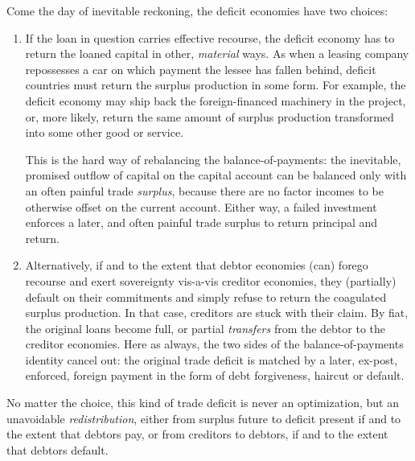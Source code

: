 \documentclass[11pt,a4paper,oneside,openright]{article}
\begin{document}
\begin{description}
\begin{enumerate}
		Come the day of inevitable reckoning, the deficit economies have two choices:
		\begin{enumerate}
			\item If the loan in question carries effective recourse, the deficit economy has to return the loaned capital in other, \emph{material} ways. 
			As when a leasing company repossesses a car on which payment the lessee has fallen behind, deficit countries must return the surplus production in some form. 
			For example, the deficit economy may ship back the foreign-financed machinery in the project, or, more likely, return the same amount of surplus production transformed into some other good or service. 
			
			This is the hard way of rebalancing the \gls{balance-of-payments}: 
			the inevitable, promised outflow of capital on the capital account can be balanced only with an often painful trade \emph{surplus}, because there are no factor incomes to be otherwise offset on the current account. 
			Either way, a failed investment enforces a later, and often painful trade surplus to return principal and return.

			\item Alternatively, if and to the extent that debtor economies (can) forego recourse and exert sovereignty vis-a-vis creditor economies, they (partially) default on their commitments and simply refuse to return the coagulated surplus production. 
			In that case, creditors are stuck with their claim. 
			By fiat, the original loans become full, or partial \emph{transfers} from the debtor to the creditor economies. 
			Here as always, the two sides of the \gls{balance-of-payments} identity cancel out: 
			the original trade deficit is matched by a later, ex-post, enforced, foreign payment in the form of debt forgiveness, haircut or default.
		\end{enumerate}

		No matter the choice, this kind of trade deficit is never an optimization, but an unavoidable \emph{redistribution}, either from surplus future to deficit present if and to the extent that debtors pay, or from creditors to debtors, if and to the extent that debtors default.
		

\end{enumerate}
\end{description}
\end{document}
